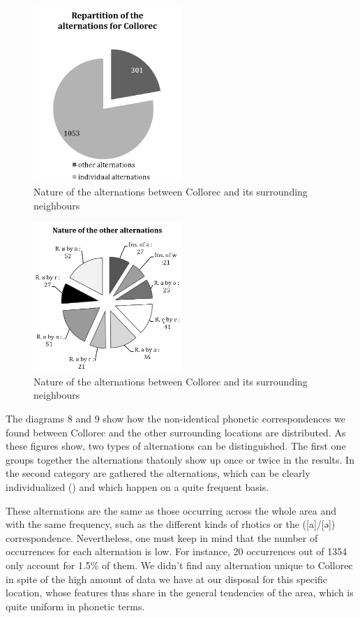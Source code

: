 \documentclass[output=paper]{LSP/langsci}
\begin{document}
\begin{figure}
\includegraphics[width=0.5\textwidth]{illustrations/brun_etal_fig8}
\caption{Nature of the alternations between Collorec and its surrounding neighbours}
\label{fig:8}
\end{figure}

\begin{figure}
\includegraphics[width=0.5\textwidth]{illustrations/brun_etal_fig9}
\caption{Nature of the alternations between Collorec and its surrounding neighbours}
\label{fig:9}
\end{figure}

The diagrams 8 and 9 show how the non-identical phonetic correspondences we found between Collorec and the other surrounding locations are distributed. As these figures show, two types of alternations can be distinguished. The first one groups together the alternations thatonly show up once or twice in the results. In the second category are gathered the alternations, which can be clearly individualized () and which happen on a quite frequent basis.

These alternations are the same as those occurring across the whole area and with the same frequency, such as the different kinds of rhotics or the ([a]/[ə]) correspondence. Nevertheless, one must keep in mind that the number of occurrences for each alternation is low. For instance, 20 occurrences out of 1354 only account for 1.5\% of them. We didn’t find any alternation unique to Collorec in spite of the high amount of data we have at our disposal for this specific location, whose features thus share in the general tendencies of the area, which is quite uniform in phonetic terms.
\end{document}
